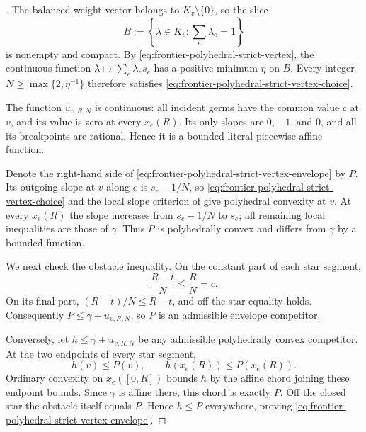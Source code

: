 
\begin{proof}[]
The balanced weight vector belongs to $K_v\setminus\{0\}$, so the slice
\[
              B:=\left\{\lambda\in K_v:\sum_e\lambda_e=1\right\}
\]
is nonempty and compact.  By
\eqref{eq:frontier-polyhedral-strict-vertex}, the continuous function
$\lambda\mapsto\sum_e\lambda_es_e$ has a positive minimum $\eta$ on
$B$.  Every integer $N\geq\max\{2,\eta^{-1}\}$ therefore satisfies
\eqref{eq:frontier-polyhedral-strict-vertex-choice}.

The function $u_{v,R,N}$ is continuous: all incident germs have the common
value $c$ at $v$, and its value is zero at every $x_e(R)$.  Its only slopes
are $0$, $-1$, and $0$, and all its breakpoints are rational.  Hence it is a
bounded literal piecewise-affine function.

Denote the right-hand side of
\eqref{eq:frontier-polyhedral-strict-vertex-envelope} by $P$.  Its outgoing
slope at $v$ along $e$ is $s_e-1/N$, so
\eqref{eq:frontier-polyhedral-strict-vertex-choice} and the local slope
criterion of
 give polyhedral
convexity at $v$.  At every $x_e(R)$ the slope increases from
$s_e-1/N$ to $s_e$; all remaining local inequalities are those of
$\gamma$.  Thus $P$ is polyhedrally convex and differs from $\gamma$ by a
bounded function.

We next check the obstacle inequality.  On the constant part of each star
segment,
\[
                         \frac{R-t}{N}\leq\frac RN=c.
\]
On its final part, $(R-t)/N\leq R-t$, and off the star equality holds.
Consequently $P\leq\gamma+u_{v,R,N}$, so $P$ is an admissible envelope
competitor.

Conversely, let $h\leq\gamma+u_{v,R,N}$ be any admissible polyhedrally
convex competitor.  At the two endpoints of every star segment,
\[
              h(v)\leq P(v),\qquad h(x_e(R))\leq P(x_e(R)).
\]
Ordinary convexity on $x_e([0,R])$ bounds $h$ by the affine chord joining
these endpoint bounds.  Since $\gamma$ is affine there, this chord is
exactly $P$.  Off the closed star the obstacle itself equals $P$.  Hence
$h\leq P$ everywhere, proving
\eqref{eq:frontier-polyhedral-strict-vertex-envelope}.


\end{proof}
